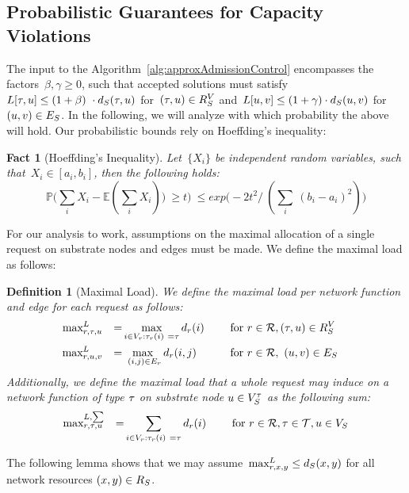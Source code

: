 \documentclass[10pt, conference, letterpaper]{IEEEtran}
\newtheorem{fact}[theorem]{Fact}
\newtheorem{definition}[theorem]{Definition}
\begin{document}
\subsection{Probabilistic Guarantees for Capacity Violations}
\label{sec:performance-guarantee-cap-violation-admission-control}
The input to the Algorithm~\ref{alg:approxAdmissionControl} 
encompasses the factors~$\beta, \gamma \geq 0$, such that accepted solutions 
must satisfy~$L[\tau,u] \leq (1+\beta)~\cdot d_{S}(\tau, u)$ for~$(\tau,u) \in  R^V_{S}$ and~$L[u,v] \leq (1+\gamma)\cdot d_{S}(u,v)$ for $(u,v) \in  E_S$. In the following, we will analyze with which probability the above will hold. Our probabilistic bounds rely on Hoeffding's inequality:
\begin{fact}[Hoeffding's Inequality]
Let~$\{X_i\}$ be independent random variables, such that~$X_i \in [a_i,b_i]$, then the following holds:
\[
\mathbb{P} \Big(\sum_i X_i - \mathbb{E}(\sum_i X_i))~\geq t\Big)~\leq exp \big(-2t^2 /~(\sum_i~(b_i - a_i)^2)\big)
\]
\end{fact}

For our analysis to work, assumptions on the maximal allocation of a single request on substrate 
nodes and edges must be made. We define the maximal load as follows:
\begin{definition}[Maximal Load]
\label{def:maximal-loads}
We define the maximal load per network function and edge for each request as follows:
\begin{alignat}{5}
\maxLoadV && = & \max_{i \in \VV: \Vtype(i)~= \type} \Vcap(i)~& & \quad \textnormal{for}~ \req \in \requests, (\type,u) \in  \SRV & \\
\maxLoadE && = & \max_{~(i,j) \in  \VE} \Vcap(i,j)~& &\quad  \textnormal{for}~ \req \in \requests,~(u,v) \in  \SE & 
\end{alignat}
Additionally, we define the maximal load that a whole request may induce on a network function of type $\tau$ on substrate node $u \in V^{\tau}_{S}$ as the following sum:
\begin{alignat}{3}
\maxLoadVSum && = & \sum_{i \in \VV: \Vtype(i)~= \type} \Vcap(i)~& \quad \textnormal{for}~ \req \in \requests, \type \in \types, u \in \SV
\end{alignat}
\end{definition}

The following lemma shows that we may assume~$\maxLoadV[\req][x][y] \leq \Scap(x,y)$ for all network resources $(x,y) \in  R_{S}$.
\end{document}
